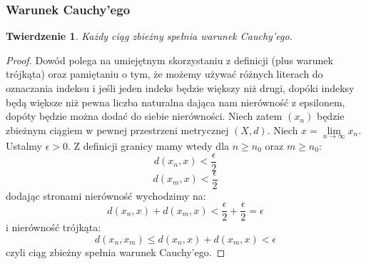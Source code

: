 \documentclass{article}
\newtheorem*{theorem}{Twierdzenie}
\begin{document}
\subsubsection{Warunek Cauchy'ego}

\begin{theorem}
    Każdy ciąg zbieżny spełnia warunek Cauchy'ego.
\end{theorem}
\begin{proof}
    Dowód polega na umiejętnym skorzystaniu z definicji (plus warunek trójkąta) oraz pamiętaniu o tym, że możemy używać
    różnych literach do oznaczania indeksu i jeśli jeden indeks będzie większy niż drugi, dopóki indeksy będą
    większe niż pewna liczba naturalna dająca nam nierówność z epsilonem, dopóty będzie można dodać do siebie nierówności.
    Niech zatem \((x_n)\) będzie zbieżnym ciągiem w pewnej przestrzeni metrycznej \((X, d)\). Niech \(x = \lim\limits_{n \to \infty} x_n\).
    Ustalmy \(\epsilon > 0\). Z definicji granicy mamy wtedy dla \(n \geq n_0\) oraz \(m \geq n_0\):
    \begin{equation*}
        d(x_n, x) < \frac{\epsilon}{2}
    \end{equation*}
    \begin{equation*}
        d(x_m, x) < \frac{\epsilon}{2}
    \end{equation*}
    dodając stronami nierówność wychodzimy na:
    \begin{equation*}
        d(x_n, x) + d(x_m, x) < \frac{\epsilon}{2} + \frac{\epsilon}{2} = \epsilon
    \end{equation*}
    i nierówność trójkąta:
    \begin{equation*}
        d(x_n, x_m) \leq d(x_n, x) + d(x_m, x) <  \epsilon
    \end{equation*}
    czyli ciąg zbieżny spełnia warunek Cauchy'ego.
\end{proof}
\end{document}
